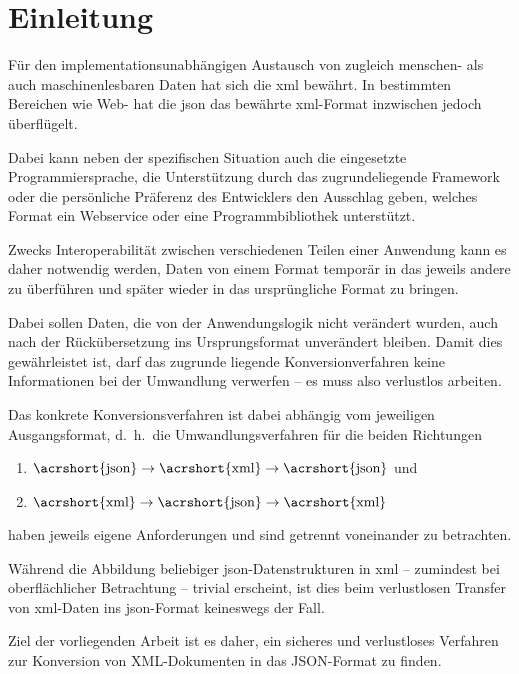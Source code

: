 \chapter{Einleitung} \label{chap:intro}

Für den implementationsunabhängigen Austausch von zugleich menschen- als auch
maschinenlesbaren Daten hat sich die \gls{xml}
bewährt. In bestimmten Bereichen wie Web- hat die \gls{json}
das bewährte \acrshort{xml}-Format inzwischen jedoch überflügelt.

Dabei kann neben der spezifischen Situation auch die eingesetzte
Programmiersprache, die Unterstützung durch das zugrundeliegende Framework
oder die persönliche Präferenz des Entwicklers den Ausschlag geben, welches
Format ein Webservice oder eine Programmbibliothek unterstützt.

Zwecks Interoperabilität zwischen verschiedenen Teilen einer Anwendung kann es
daher notwendig werden, Daten von einem Format temporär in das jeweils andere
zu überführen und später wieder in das ursprüngliche Format zu bringen.

Dabei sollen Daten, die von der Anwendungslogik nicht verändert wurden, auch
nach der Rückübersetzung ins Ursprungsformat unverändert bleiben. Damit dies
gewährleistet ist, darf das zugrunde liegende Konversionverfahren keine
Informationen bei der Umwandlung verwerfen -- es muss also verlustlos %
arbeiten.

Das konkrete Konversionsverfahren ist dabei abhängig vom jeweiligen
Ausgangsformat, d.~h.\ die Umwandlungsverfahren für die beiden Richtungen
\begin{enumerate}
    \item $\text{\acrshort{json}} \rightarrow \text{\acrshort{xml}} \rightarrow \text{\acrshort{json}}$ und
    \item $\text{\acrshort{xml}} \rightarrow \text{\acrshort{json}} \rightarrow \text{\acrshort{xml}}$
\end{enumerate}
haben jeweils eigene Anforderungen und sind getrennt voneinander zu betrachten.

Während die Abbildung beliebiger \acrshort{json}-Datenstrukturen in \acrshort{xml} -- zumindest bei
oberflächlicher Betrachtung -- trivial erscheint, ist dies beim verlustlosen
Transfer von \acrshort{xml}-Daten ins \acrshort{json}-Format keineswegs der Fall.

Ziel der vorliegenden Arbeit ist es daher, ein sicheres und verlustloses
Verfahren zur Konversion von XML-Dokumenten in das JSON-Format zu finden.

